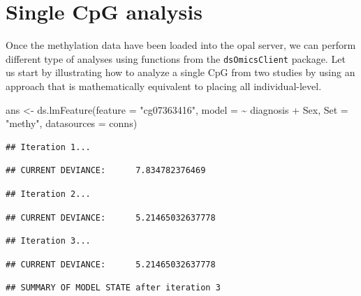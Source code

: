 \documentclass[
]{book}
\newenvironment{Shaded}{\begin{snugshade}}{\end{snugshade}}
\newcommand{\AttributeTok}[1]{\textcolor[rgb]{0.77,0.63,0.00}{#1}}
\newcommand{\FunctionTok}[1]{\textcolor[rgb]{0.00,0.00,0.00}{#1}}
\newcommand{\NormalTok}[1]{#1}
\newcommand{\OtherTok}[1]{\textcolor[rgb]{0.56,0.35,0.01}{#1}}
\newcommand{\SpecialCharTok}[1]{\textcolor[rgb]{0.00,0.00,0.00}{#1}}
\newcommand{\StringTok}[1]{\textcolor[rgb]{0.31,0.60,0.02}{#1}}
\begin{document}
\hypertarget{single-cpg-analysis}{%
\section{Single CpG analysis}\label{single-cpg-analysis}}

Once the methylation data have been loaded into the opal server, we can perform different type of analyses using functions from the \texttt{dsOmicsClient} package. Let us start by illustrating how to analyze a single CpG from two studies by using an approach that is mathematically equivalent to placing all individual-level.

\begin{Shaded}
\begin{Highlighting}[]
\NormalTok{ans }\OtherTok{\textless{}{-}} \FunctionTok{ds.lmFeature}\NormalTok{(}\AttributeTok{feature =} \StringTok{"cg07363416"}\NormalTok{, }
                    \AttributeTok{model =} \SpecialCharTok{\textasciitilde{}}\NormalTok{ diagnosis }\SpecialCharTok{+}\NormalTok{ Sex, }
                    \AttributeTok{Set =} \StringTok{"methy"}\NormalTok{,}
                    \AttributeTok{datasources =}\NormalTok{ conns)}
\end{Highlighting}
\end{Shaded}

\begin{verbatim}
## Iteration 1...
\end{verbatim}

\begin{verbatim}
## CURRENT DEVIANCE:      7.834782376469
\end{verbatim}

\begin{verbatim}
## Iteration 2...
\end{verbatim}

\begin{verbatim}
## CURRENT DEVIANCE:      5.21465032637778
\end{verbatim}

\begin{verbatim}
## Iteration 3...
\end{verbatim}

\begin{verbatim}
## CURRENT DEVIANCE:      5.21465032637778
\end{verbatim}

\begin{verbatim}
## SUMMARY OF MODEL STATE after iteration 3
\end{verbatim}
\end{document}
